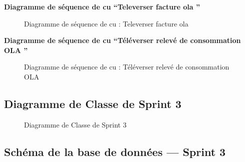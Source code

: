 \documentclass[a4paper,11pt]{report}
\begin{document}
\newpage
\textbf{ Diagramme de séquence de cu “Televerser facture ola ”}

\begin{figure}[H]
  \centering
  \setlength{\fboxrule}{1pt}
  \setlength{\fboxsep}{3pt}
  \caption{ Diagramme de séquence de cu : Televerser facture ola
 }
  \label{fig:clone-result}
\end{figure}


\newpage
\textbf{ Diagramme de séquence de cu “Téléverser relevé de consommation OLA ”}

\begin{figure}[H]
  \centering
  \setlength{\fboxrule}{1pt}
  \setlength{\fboxsep}{3pt}
  \caption{ Diagramme de séquence de cu : Téléverser relevé de consommation OLA
 }
  \label{fig:clone-result}
\end{figure}


\subsection{Diagramme de Classe de Sprint 3}



\begin{figure}[H]
  \centering
  \setlength{\fboxrule}{1pt}
  \setlength{\fboxsep}{3pt}
  \caption{ Diagramme de Classe de Sprint 3
 }
  \label{fig:clone-result}
\end{figure}
\subsection{Schéma de la base de données — Sprint 3}
\end{document}
